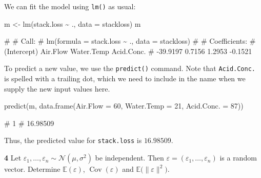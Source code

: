 \documentclass[
  a4paper,
]{article}
\newenvironment{Shaded}{\begin{snugshade}}{\end{snugshade}}
\newcommand{\AttributeTok}[1]{\textcolor[rgb]{0.77,0.63,0.00}{#1}}
\newcommand{\DecValTok}[1]{\textcolor[rgb]{0.00,0.00,0.81}{#1}}
\newcommand{\FunctionTok}[1]{\textcolor[rgb]{0.00,0.00,0.00}{#1}}
\newcommand{\NormalTok}[1]{#1}
\newcommand{\OtherTok}[1]{\textcolor[rgb]{0.56,0.35,0.01}{#1}}
\newcommand{\SpecialCharTok}[1]{\textcolor[rgb]{0.00,0.00,0.00}{#1}}
\theoremstyle{definition}
\theoremstyle{definition}
\theoremstyle{definition}
\theoremstyle{definition}
\theoremstyle{remark}
\begin{document}
\begin{myanswers}
We can fit the model using \texttt{lm()} as usual:

\begin{Shaded}
\begin{Highlighting}[]
\NormalTok{m }\OtherTok{\textless{}{-}} \FunctionTok{lm}\NormalTok{(stack.loss }\SpecialCharTok{\textasciitilde{}}\NormalTok{ ., }\AttributeTok{data =}\NormalTok{ stackloss)}
\NormalTok{m}
\end{Highlighting}
\end{Shaded}

\begin{Shaded}
\begin{Highlighting}[]
\NormalTok{\# }
\NormalTok{\# Call:}
\NormalTok{\# lm(formula = stack.loss \textasciitilde{} ., data = stackloss)}
\NormalTok{\# }
\NormalTok{\# Coefficients:}
\NormalTok{\# (Intercept)     Air.Flow   Water.Temp   Acid.Conc.  }
\NormalTok{\#    {-}39.9197       0.7156       1.2953      {-}0.1521}
\end{Highlighting}
\end{Shaded}

To predict a new value, we use the \texttt{predict()} command. Note that
\texttt{Acid.Conc.} is spelled with a trailing dot, which we need to include
in the name when we supply the new input values here.

\begin{Shaded}
\begin{Highlighting}[]
\FunctionTok{predict}\NormalTok{(m, }\FunctionTok{data.frame}\NormalTok{(}\AttributeTok{Air.Flow =} \DecValTok{60}\NormalTok{, }\AttributeTok{Water.Temp =} \DecValTok{21}\NormalTok{, }\AttributeTok{Acid.Conc. =} \DecValTok{87}\NormalTok{))}
\end{Highlighting}
\end{Shaded}

\begin{Shaded}
\begin{Highlighting}[]
\NormalTok{\#        1 }
\NormalTok{\# 16.98509}
\end{Highlighting}
\end{Shaded}

Thus, the predicted value for \texttt{stack.loss} is \(16.98509\).

\end{myanswers}

\textbf{4} Let \(\varepsilon_1, \ldots, \varepsilon_n \sim \mathcal{N}(\mu, \sigma^2)\) be independent.
Then \(\varepsilon= (\varepsilon_1, \ldots, \varepsilon_n)\) is a random vector. Determine
\(\mathbb{E}(\varepsilon)\), \(\mathop{\mathrm{Cov}}(\varepsilon)\) and \(\mathbb{E}\bigl( \|\varepsilon\|^2 \bigr)\).
\end{document}
